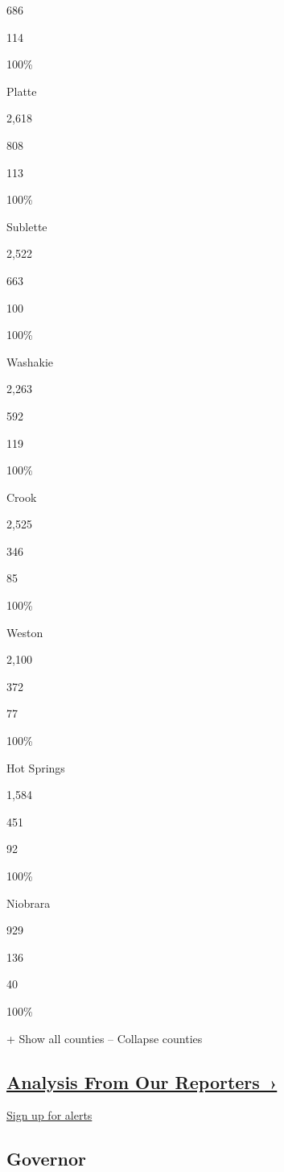 686

114

100\%

Platte

2,618

808

113

100\%

Sublette

2,522

663

100

100\%

Washakie

2,263

592

119

100\%

Crook

2,525

346

85

100\%

Weston

2,100

372

77

100\%

Hot Springs

1,584

451

92

100\%

Niobrara

929

136

40

100\%

+ Show all counties -- Collapse counties

\hypertarget{analysis-from-our-reporters-}{%
\subsection{\texorpdfstring{\href{https://www.nytimes3xbfgragh.onion/interactive/2018/11/06/us/elections/live-midterm-election-analysis-updates.html}{Analysis
From Our
Reporters~›}}{Analysis From Our Reporters~›}}\label{analysis-from-our-reporters-}}

\protect\hyperlink{}{Sign up for alerts}

\hypertarget{governor}{%
\subsection{Governor}\label{governor}}

